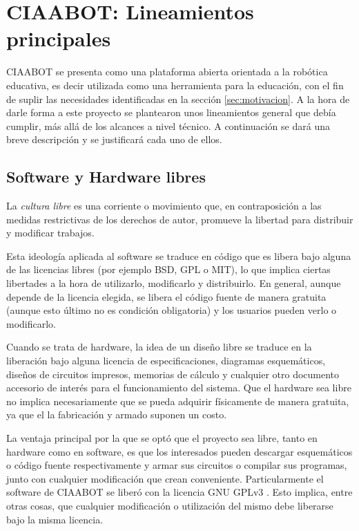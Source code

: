 \section{CIAABOT: Lineamientos principales}
\label{sec:ciaabot:lineamientos}
CIAABOT se presenta como una plataforma abierta orientada a la robótica educativa, es decir utilizada como una herramienta para la educación, con el fin de suplir las necesidades identificadas en la sección \ref{sec:motivacion}. A la hora de darle forma a este proyecto se plantearon unos lineamientos general que debía cumplir, más allá de los alcances a nivel técnico. A continuación se dará una breve descripción y se justificará cada uno de ellos.

\subsection{Software y Hardware libres}
\label{subsec:sotwareLibre}
La \emph{cultura libre} es una corriente o movimiento que, en contraposición a las medidas restrictivas de los derechos de autor, promueve la libertad para distribuir y modificar trabajos.

Esta ideología aplicada al software se traduce en código que es libera bajo alguna de las licencias libres (por ejemplo BSD, GPL o MIT), lo que implica ciertas libertades a la hora de utilizarlo, modificarlo y distribuirlo. En general, aunque depende de la licencia elegida, se libera el código fuente de manera gratuita (aunque esto último no es condición obligatoria) y los usuarios pueden verlo o modificarlo.

Cuando se trata de hardware, la idea de un diseño libre se traduce en la liberación bajo alguna licencia de especificaciones, diagramas esquemáticos, diseños de circuitos impresos, memorias de cálculo y cualquier otro documento accesorio de interés para el funcionamiento del sistema. Que el hardware sea libre no implica necesariamente que se pueda adquirir físicamente de manera gratuita, ya que el la fabricación y armado suponen un costo. 

La ventaja principal por la que se optó que el proyecto sea libre, tanto en hardware como en software, es que los interesados pueden descargar esquemáticos o código fuente respectivamente y armar sus circuitos o compilar sus programas, junto con cualquier modificación que crean conveniente. Particularmente el software de CIAABOT se liberó con la licencia GNU GPLv3 \citep{GPLv3}. Esto implica, entre otras cosas, que cualquier modificación o utilización del mismo debe liberarse bajo la misma licencia.


